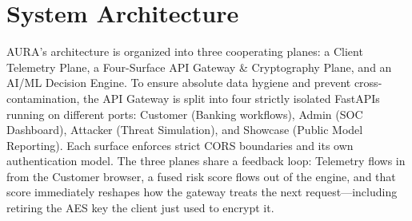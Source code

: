 \documentclass[11pt,journal,onecolumn]{article}
\begin{document}
\section{System Architecture}
AURA’s architecture is organized into three cooperating planes: a Client Telemetry Plane, a Four-Surface API Gateway & Cryptography Plane, and an AI/ML Decision Engine. To ensure absolute data hygiene and prevent cross-contamination, the API Gateway is split into four strictly isolated FastAPIs running on different ports: Customer (Banking workflows), Admin (SOC Dashboard), Attacker (Threat Simulation), and Showcase (Public Model Reporting). Each surface enforces strict CORS boundaries and its own authentication model. The three planes share a feedback loop: Telemetry flows in from the Customer browser, a fused risk score flows out of the engine, and that score immediately reshapes how the gateway treats the next request—including retiring the AES key the client just used to encrypt it.
\end{document}
